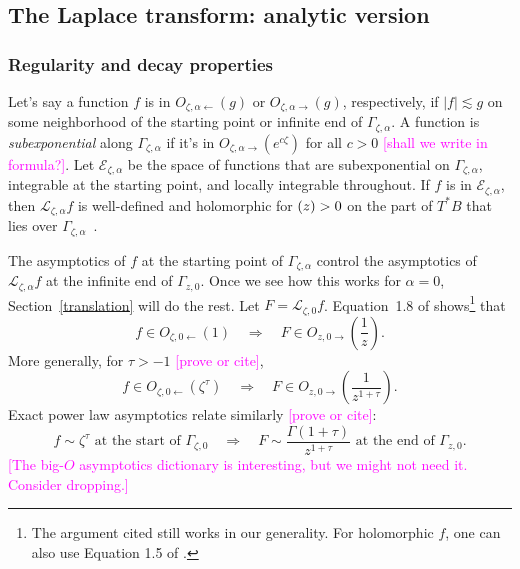 \documentclass{article}
\let\Re\relax
\DeclareMathOperator{\Re}{Re}
\theoremstyle{definition}
\newcommand{\laplace}{\mathcal{L}}
\begin{document}
\subsection{The Laplace transform: analytic version}
\subsubsection{Regularity and decay properties}\label{reg-decay}


Let's say a function $f$ is in $O_{\zeta, \alpha \leftarrow}(g)$ or $O_{\zeta, \alpha \rightarrow}(g)$, respectively, if $|f| \lesssim g$ on some neighborhood of the starting point or infinite end of $\Gamma_{\zeta, \alpha}$. A function is {\em subexponential} along $\Gamma_{\zeta, \alpha}$ if it's in $O_{\zeta, \alpha \rightarrow}(e^{c\zeta})$ for all $c > 0$ \textcolor{magenta}{[shall we write in formula?]}. Let $\mathcal{E}_{\zeta, \alpha}$ be the space of functions that are subexponential on $\Gamma_{\zeta, \alpha}$, integrable at the starting point, and locally integrable throughout. If $f$ is in $\mathcal{E}_{\zeta, \alpha}$, then $\laplace_{\zeta, \alpha} f$ is well-defined and holomorphic for $\Re(z) > 0$ on the part of $T^*B$ that lies over $\Gamma_{\zeta, \alpha}$~\cite[\S 5.6]{diverg-resurg-i}.

The asymptotics of $f$ at the starting point of $\Gamma_{\zeta, \alpha}$ control the asymptotics of $\laplace_{\zeta, \alpha} f$ at the infinite end of $\Gamma_{z, 0}$. Once we see how this works for $\alpha = 0$, Section~\ref{translation} will do the rest. Let $F = \laplace_{\zeta, 0} f$. Equation~1.8 of \cite{laplace-tfm} shows\footnote{The argument cited still works in our generality. For holomorphic $f$, one can also use Equation 1.5 of \cite{sternin1995borel}.} that
\[ f \in O_{\zeta, 0 \leftarrow}(1) \quad\Longrightarrow\quad F \in O_{z, 0 \rightarrow}\left(\frac{1}{z}\right). \]
More generally, for $\tau > -1$ \textcolor{magenta}{[prove or cite]},
\[ f \in O_{\zeta, 0 \leftarrow}(\zeta^\tau) \quad\Longrightarrow\quad F \in O_{z, 0 \rightarrow}\left(\frac{1}{z^{1 + \tau}}\right). \]
Exact power law asymptotics relate similarly \textcolor{magenta}{[prove or cite]}:
\[ f \sim \zeta^\tau \text{ at the start of } \Gamma_{\zeta, 0} \quad\Longrightarrow\quad F \sim \frac{\Gamma(1+\tau)}{z^{1+\tau}} \text{ at the end of } \Gamma_{z, 0}. \]
\textcolor{magenta}{[The big-$O$ asymptotics dictionary is interesting, but we might not need it. Consider dropping.]}
\end{document}
